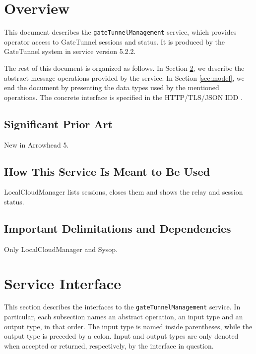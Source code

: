 \documentclass[a4paper]{arrowhead}
\begin{document}
\section{Overview}
\label{sec:overview}

This document describes the \texttt{gate\allowbreak{}Tunnel\allowbreak{}Management} service, which provides operator access to GateTunnel sessions and status.
It is produced by the GateTunnel system \cite{gt-sysd} in service version 5.2.2.

The rest of this document is organized as follows.
In Section \ref{sec:operations}, we describe the abstract message operations provided by the service.
In Section \ref{sec:model}, we end the document by presenting the data types used by the mentioned operations.
The concrete interface is specified in the HTTP/TLS/JSON IDD \cite{gt-gateTunnelManagement-http-idd}.

\subsection{Significant Prior Art}

New in Arrowhead 5.

\subsection{How This Service Is Meant to Be Used}

LocalCloudManager lists sessions, closes them and shows the relay and session status.

\subsection{Important Delimitations and Dependencies}
\label{sec:delimitations}

Only LocalCloudManager and Sysop.

\newpage

\section{Service Interface}
\label{sec:operations}

This section describes the interfaces to the \texttt{gate\allowbreak{}Tunnel\allowbreak{}Management} service.
In particular, each subsection names an abstract operation, an input type and an output type, in that order.
The input type is named inside parentheses, while the output type is preceded by a colon.
Input and output types are only denoted when accepted or returned, respectively, by the interface in question.
\end{document}
